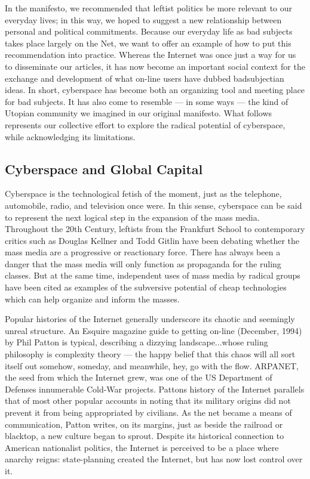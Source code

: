 \documentclass[letterpaper,12pt,english]{sphinxmanual}
\begin{document}
In the manifesto, we recommended that leftist politics be more relevant to our everyday lives; in this way, we hoped to suggest a new relationship between personal and political commitments. Because our everyday life as bad subjects takes place largely on the Net, we want to offer an example of how to put this recommendation into practice. Whereas the Internet was once just a way for us to disseminate our articles, it has now become an important social context for the exchange and development of what on-line users have dubbed badsubjectian ideas. In short, cyberspace has become both an organizing tool and meeting place for bad subjects. It has also come to resemble — in some ways — the kind of Utopian community we imagined in our original manifesto. What follows represents our collective effort to explore the radical potential of cyberspace, while acknowledging its limitations.


\subsection{Cyberspace and Global Capital}
\label{1995:cyberspace-and-global-capital}
Cyberspace is the technological fetish of the moment, just as the telephone, automobile, radio, and television once were. In this sense, cyberspace can be said to represent the next logical step in the expansion of the mass media. Throughout the 20th Century, leftists from the Frankfurt School to contemporary critics such as Douglas Kellner and Todd Gitlin have been debating whether the mass media are a progressive or reactionary force. There has always been a danger that the mass media will only function as propaganda for the ruling classes. But at the same time, independent uses of mass media by radical groups have been cited as examples of the subversive potential of cheap technologies which can help organize and inform the masses.

Popular histories of the Internet generally underscore its chaotic and seemingly unreal structure. An Esquire magazine guide to getting on-line (December, 1994) by Phil Patton is typical, describing a dizzying landscape...whose ruling philosophy is complexity theory — the happy belief that this chaos will all sort itself out somehow, someday, and meanwhile, hey, go with the flow. ARPANET, the seed from which the Internet grew, was one of the US Department of Defenses innumerable Cold-War projects. Pattons history of the Internet parallels that of most other popular accounts in noting that its military origins did not prevent it from being appropriated by civilians. As the net became a means of communication, Patton writes, on its margins, just as beside the railroad or blacktop, a new culture began to sprout. Despite its historical connection to American nationalist politics, the Internet is perceived to be a place where anarchy reigns: state-planning created the Internet, but has now lost control over it.
\end{document}
